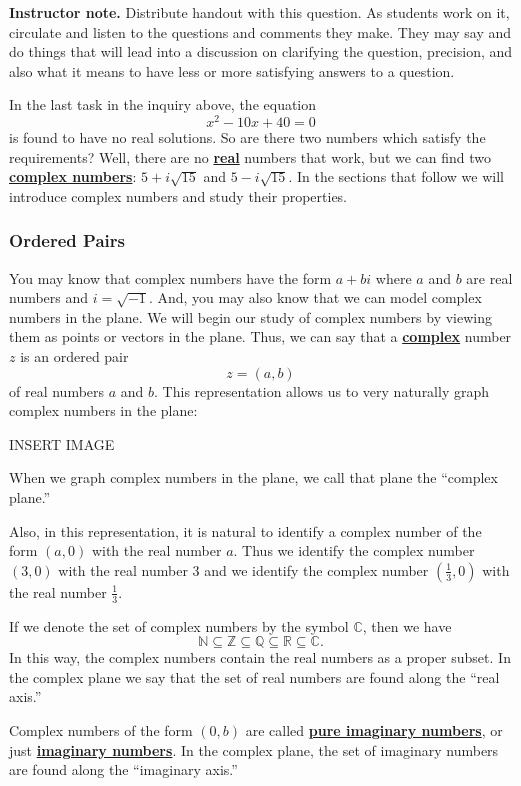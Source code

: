 \documentclass[11pt]{article}
\newcommand\smallnote[1]
	{\begin{mdframed}\raggedright  {\bf Instructor note.} {#1} \end{mdframed}}
\renewcommand\emph[1]{\underline{\bf{#1}}} %
\theoremstyle{definition}
\begin{document}
\smallnote{
Distribute handout with this question. As students work on it, circulate and listen to the questions and comments they make. They may say and do things that will lead into a discussion on clarifying the question, precision, and also what it means to have less or more satisfying answers to a question.
}

In the last task in the inquiry above, the equation
\[ x^2 - 10x + 40 = 0\]
is found to have no real solutions. So are there two numbers which satisfy the requirements?  Well, there are no \emph{real} numbers that work, but
we can find two \emph{complex numbers}: $5 + i\sqrt{15}$ and $5-i\sqrt{15}$. In the sections that follow we will introduce complex numbers and study their 
properties.

\subsubsection{Ordered Pairs}

You may know that complex numbers have the form $a + bi$ where $a$ and $b$ are real numbers and $i = \sqrt{-1}$. And, you may also know that we can model 
complex numbers in the plane. We will begin our study of complex numbers by viewing them as points or vectors in the plane. Thus, we can say that a 
\emph{complex} number $z$ is an ordered pair
\[ z = (a,b)\]
of real numbers $a$ and $b$. This representation allows us to very naturally graph complex numbers in the plane:

\begin{center}
  INSERT IMAGE
\end{center}

When we graph complex numbers in the plane, we call that plane the ``complex plane.''

Also, in this representation, it is natural to identify a complex number of the form $(a,0)$ with the real number $a$. Thus we identify the complex number
$(3,0)$ with the real number 3 and we identify the complex number $\left( \frac{1}{3},0 \right)$ with the real number $\frac{1}{3}$. 

If we denote the set of complex numbers by the symbol $\mathbb{C}$, then we have
\[ \mathbb{N} \subseteq \mathbb{Z} \subseteq \mathbb{Q} \subseteq \mathbb{R} \subseteq \mathbb{C}.\]
In this way, the complex numbers contain the real numbers as a proper subset. In the complex plane we say that the set of real numbers are found along the ``real axis.''

Complex numbers of the form $(0,b)$ are called \emph{pure imaginary numbers}, or just \emph{imaginary numbers}. In the complex plane, the set of imaginary numbers
are found along the ``imaginary axis.''
\end{document}
